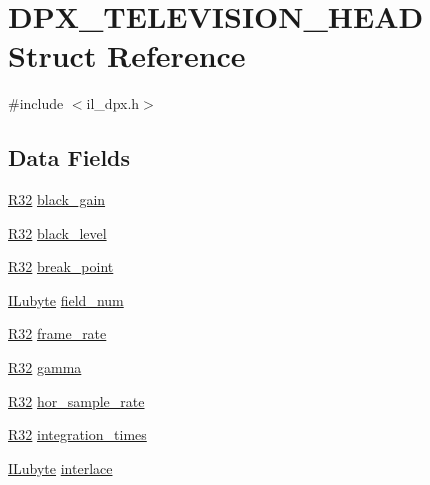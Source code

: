 \hypertarget{struct_d_p_x___t_e_l_e_v_i_s_i_o_n___h_e_a_d}{\section{D\-P\-X\-\_\-\-T\-E\-L\-E\-V\-I\-S\-I\-O\-N\-\_\-\-H\-E\-A\-D Struct Reference}
\label{struct_d_p_x___t_e_l_e_v_i_s_i_o_n___h_e_a_d}
}


{\ttfamily \#include $<$il\-\_\-dpx.\-h$>$}

\subsection*{Data Fields}
\begin{DoxyCompactItemize}
\item 
\hyperlink{struct_r32}{R32} \hyperlink{struct_d_p_x___t_e_l_e_v_i_s_i_o_n___h_e_a_d_a17cd5bc778eb7d2115de2e77b9645d95}{black\-\_\-gain}
\item 
\hyperlink{struct_r32}{R32} \hyperlink{struct_d_p_x___t_e_l_e_v_i_s_i_o_n___h_e_a_d_a9ea8908e9e40e44bfba61aedfdc2c7aa}{black\-\_\-level}
\item 
\hyperlink{struct_r32}{R32} \hyperlink{struct_d_p_x___t_e_l_e_v_i_s_i_o_n___h_e_a_d_ac1631225fc4cd1a4559bb0293e37ce4e}{break\-\_\-point}
\item 
\hyperlink{il_8h_a8d2f04500100a86d1b00e98ab1b15a33}{I\-Lubyte} \hyperlink{struct_d_p_x___t_e_l_e_v_i_s_i_o_n___h_e_a_d_af1a6784b5a28bdec41b5b8a8f40cf220}{field\-\_\-num}
\item 
\hyperlink{struct_r32}{R32} \hyperlink{struct_d_p_x___t_e_l_e_v_i_s_i_o_n___h_e_a_d_a29b645c6d040aba77e3294af9c5157fb}{frame\-\_\-rate}
\item 
\hyperlink{struct_r32}{R32} \hyperlink{struct_d_p_x___t_e_l_e_v_i_s_i_o_n___h_e_a_d_a78ec68acf6138f3986b414aed772312c}{gamma}
\item 
\hyperlink{struct_r32}{R32} \hyperlink{struct_d_p_x___t_e_l_e_v_i_s_i_o_n___h_e_a_d_a4c98efc1b032c59b1df1abdd3557c073}{hor\-\_\-sample\-\_\-rate}
\item 
\hyperlink{struct_r32}{R32} \hyperlink{struct_d_p_x___t_e_l_e_v_i_s_i_o_n___h_e_a_d_aba9c1d31b6bdebc7d2730d56a3e06d08}{integration\-\_\-times}
\item 
\hyperlink{il_8h_a8d2f04500100a86d1b00e98ab1b15a33}{I\-Lubyte} \hyperlink{struct_d_p_x___t_e_l_e_v_i_s_i_o_n___h_e_a_d_a49fd77723caf7aa670854d655af4251b}{interlace}
\item 

\end{DoxyCompactItemize}

